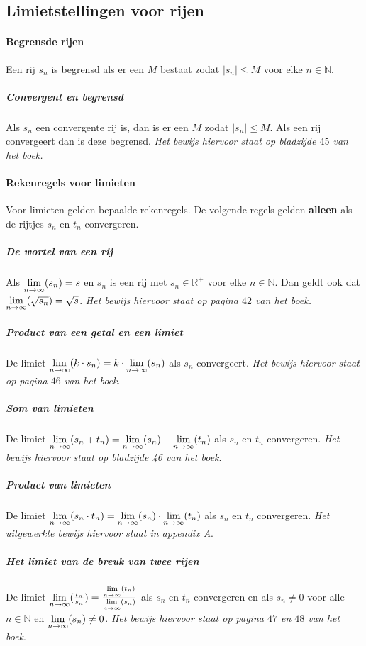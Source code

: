 \subsection{Limietstellingen voor rijen}
\paragraph{Begrensde rijen} Een rij $s_{n}$ is begrensd als er een $M$ bestaat zodat $|s_{n}| \leq M$ voor elke $n\in\mathbb{N}$.

\subparagraph{Convergent en begrensd} Als $s_{n}$ een convergente rij is, dan is er een $M$ zodat $|s_{n}| \leq M$. Als een rij convergeert dan is deze begrensd. \textit{Het bewijs hiervoor staat op bladzijde $45$ van het boek.}

\paragraph{Rekenregels voor limieten} Voor limieten gelden bepaalde rekenregels. De volgende regels gelden \textbf{alleen} als de rijtjes $s_{n}$ en $t_{n}$ convergeren.

\subparagraph{De wortel van een rij} Als $\underset{n\to\infty}{\text{lim}}(s_{n})=s$ en $s_{n}$ is een rij met $s_{n}\in\mathbb{R}^{+}$ voor elke $n\in\mathbb{N}$. Dan geldt ook dat $\underset{n\to\infty}{\text{lim}}(\sqrt{s_{n}})=\sqrt{s}$. \textit{Het bewijs hiervoor staat op pagina $42$ van het boek.}

\subparagraph{Product van een getal en een limiet} De limiet $\underset{n\to\infty}{\text{lim}}(k \cdot s_{n}) = k\cdot\underset{n\to\infty}{\text{lim}}(s_{n})$ als $s_{n}$ convergeert. \textit{Het bewijs hiervoor staat op pagina $46$ van het boek}.

\subparagraph{Som van limieten} De limiet $\underset{n\to\infty}{\text{lim}}(s_{n}+t_{n}) = \underset{n\to\infty}{\text{lim}}(s_{n})+\underset{n\to\infty}{\text{lim}}(t_{n})$ als $s_{n}$ en $t_{n}$ convergeren. \textit{Het bewijs hiervoor staat op bladzijde 46 van het boek}.

\subparagraph{Product van limieten} De limiet $\underset{n\to\infty}{\text{lim}}(s_{n} \cdot t_{n}) = \underset{n\to\infty}{\text{lim}}(s_{n}) \cdot \underset{n\to\infty}{\text{lim}}(t_{n})$ als $s_{n}$ en $t_{n}$ convergeren. \textit{Het uitgewerkte bewijs hiervoor staat in \hyperref[sec:AA]{appendix A}}.

\subparagraph{Het limiet van de breuk van twee rijen} De limiet $\underset{n\to\infty}{\text{lim}}(\frac{t_{n}}{s_{n}}) = \frac{\underset{n\to\infty}{\text{lim}}(t_{n})}{\underset{n\to\infty}{\text{lim}}(s_{n})}$ als $s_{n}$ en $t_{n}$ convergeren en als $s_{n}\neq0$ voor alle $n\in\mathbb{N}$ en $\underset{n\to\infty}{\text{lim}}(s_{n}) \neq 0$. \textit{Het bewijs hiervoor staat op pagina $47$ en $48$ van het boek}.

